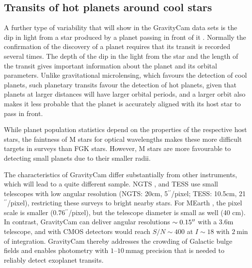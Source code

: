 \documentclass{pasa}%
\newcommand\arcsec{\hbox{$^{\prime\prime}$}}
\begin{document}

\subsection{Transits of hot planets around cool stars}

A further type of variability that will show in the \mbox{GravityCam} data sets is the dip in light from a star produced by a planet passing in front of it \citep{Struve:exoplanet}.  Normally the confirmation of the discovery of a planet requires that its transit is recorded several times.  The depth of the dip in the light from the star and the length of the transit gives important information about the planet and its orbital parameters. Unlike gravitational microlensing, which favours the detection of cool planets, such planetary transits favour the detection of hot planets, given that planets at larger distances will have larger orbital periods, and a larger orbit also makes it less probable that the planet is accurately aligned with its host star to pass in front.

While planet population statistics depend on the properties of the respective host stars, the faintness of M stars for optical wavelengths makes these more difficult targets in surveys than FGK stars. However, M stars are more favourable to detecting small planets due to their smaller radii.

The characteristics of \mbox{GravityCam} differ substantially from other instruments, which will lead to a quite different sample. 
NGTS \citep[Next Generation Transit survey;][]{2017PASP..129b5002M}, and TESS  \citep{TESS} use small telescopes with low angular resolution (NGTS: 20cm, 5\arcsec/pixel; TESS: 10.5cm, 21\arcsec/pixel), restricting these surveys to bright nearby stars. For MEarth \citep{2008PASP..120..317N}, the pixel scale is smaller (0.76\arcsec/pixel), but the telescope diameter is small as well (40 cm).
In contrast, \mbox{GravityCam} can deliver angular resolutions $\sim 0.15\arcsec$ with a 3.6m telescope, and with CMOS detectors would reach $S/N \sim 400$ 
at $I \sim 18$ with $2~\mbox{min}$ of integration. \mbox{GravityCam} thereby addresses the crowding of Galactic bulge fields and enables photometry with 
$1$--$10~\mbox{mmag}$ precision that is needed to reliably detect exoplanet 
transits.
\end{document}
